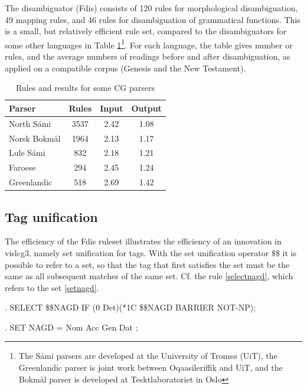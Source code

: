 \documentclass[11pt]{article}
\begin{document}
The disambiguator (Fdis) consists of 120 rules for morphological disambiguation,  49 mapping rules, and 46 rules for disambiguation of grammatical functions. This is a small, but relatively efficient rule set, compared to the disambiguators for some other languages in Table \ref{rulecount}\footnote{The Sámi parsers are developed at the University of Tromsø (UiT), the Greenlandic parser is joint work between Oqaasileriffik and UiT, and the Bokmål parser is developed at Tesktlaboratoriet in Oslo}. For each language, the table gives number or rules, and the average numbers of readings before and after disambiguation, as applied on a compatible corpus (Genesis and the New Testament).

\begin{table}[htdp]
\caption{Rules and results for some CG parsers}
\begin{center}
\begin{tabular}{|l|c|c|c|}
\hline
Parser & Rules & Input & Output \\
\hline
North Sámi	  & 3537 & 2.42 & 1.08 \\
Norsk Bokmål  & 1964 & 2.13 & 1.17 \\
Lule Sámi	  &  832 & 2.18 & 1.21 \\
Faroese		  &  294 & 2.45 & 1.24 \\
Greenlandic	  &  518 & 2.69 & 1.42 \\
\hline
\end{tabular}
\end{center}
\label{rulecount}
\end{table}%

\subsection{Tag unification}

The efficiency of the Fdis ruleset illustrates the efficiency of an innovation in vislcg3, namely set unification for tags. With the set unification operator $\$\$$ it is possible to refer to a set, so that the tag that first satisfies the set must be the same as all subsequent matches of the same set. Cf. the rule \ref{selectnagd}, which refers to the set \ref{setnagd}.

\begin{flushleft}
\ex.\label{selectnagd} \small{SELECT \$\$NAGD IF (0 Det)(*1C \$\$NAGD BARRIER NOT-NP);}

\ex.\label{setnagd} \small{SET NAGD = Nom Acc Gen Dat ;}
\end{flushleft}
\end{document}
